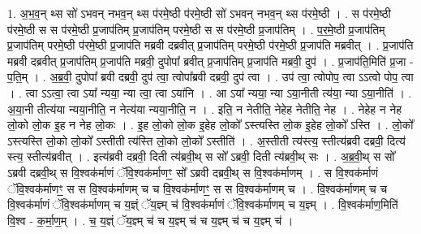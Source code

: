 \documentclass[17pt]{extarticle}
\begin{document}
1. अ॒भ॒व॒न् थ्स सो॑ ऽभवन् नभव॒न् थ्स प॑रमे॒ष्ठी प॑रमे॒ष्ठी सो॑ ऽभवन् नभव॒न् थ्स प॑रमे॒ष्ठी । . स प॑रमे॒ष्ठी प॑रमे॒ष्ठी स स प॑रमे॒ष्ठी प्र॒जाप॑तिम् प्र॒जाप॑तिम् परमे॒ष्ठी स स प॑रमे॒ष्ठी प्र॒जाप॑तिम् । . प॒र॒मे॒ष्ठी प्र॒जाप॑तिम् प्र॒जाप॑तिम् परमे॒ष्ठी प॑रमे॒ष्ठी प्र॒जाप॑ति मब्रवी दब्रवीत् प्र॒जाप॑तिम् परमे॒ष्ठी प॑रमे॒ष्ठी प्र॒जाप॑ति मब्रवीत् । . प्र॒जाप॑ति मब्रवी दब्रवीत् प्र॒जाप॑तिम् प्र॒जाप॑ति मब्रवी॒ दुपोपा᳚ ब्रवीत् प्र॒जाप॑तिम् प्र॒जाप॑ति मब्रवी॒ दुप॑ । . प्र॒जाप॑ति॒मिति॑ प्र॒जा - प॒ति॒म् । . अ॒ब्र॒वी॒ दुपोपा᳚ ब्रवी दब्रवी॒ दुप॑ त्वा॒ त्वोपा᳚ब्रवी दब्रवी॒ दुप॑ त्वा । . उप॑ त्वा॒ त्वोपोप॒ त्वा ऽऽत्वो पोप॒ त्वा । . त्वा ऽऽत्वा॒ त्वा ऽया᳚ न्यया॒ न्या त्वा॒ त्वा ऽया॑नि । . आ ऽया᳚ न्यया॒ न्या ऽया॒नीती त्य॑या॒ न्या ऽया॒नीति॑ । . अ॒या॒नी तीत्य॑या न्यया॒नीति॒ न नेत्य॑या न्यया॒नीति॒ न । . इति॒ न नेतीति॒ नेहेह नेतीति॒ नेह । . नेहेह न नेह लो॒को लो॒क इ॒ह न नेह लो॒कः । . इ॒ह लो॒को लो॒क इ॒हेह लो॒को᳚ ऽस्त्यस्ति लो॒क इ॒हेह लो॒को᳚ ऽस्ति । . लो॒को᳚ ऽस्त्यस्ति लो॒को लो॒को᳚ ऽस्तीती त्य॑स्ति लो॒को लो॒को᳚ ऽस्तीति॑ । . अ॒स्तीती त्य॑स्त्य॒ स्तीत्य॑ब्रवी दब्रवी॒ दित्य॑ स्त्य॒ स्तीत्य॑ब्रवीत् । . इत्य॑ब्रवी दब्रवी॒ दिती त्य॑ब्रवी॒थ् स सो᳚ ऽब्रवी॒ दिती त्य॑ब्रवी॒थ् सः । . अ॒ब्र॒वी॒थ् स सो᳚ ऽब्रवी दब्रवी॒थ् स वि॒श्वक॑र्माणं ॅवि॒श्वक॑र्माणꣳ॒॒ सो᳚ ऽब्रवी दब्रवी॒थ् स वि॒श्वक॑र्माणम् । . स वि॒श्वक॑र्माणं ॅवि॒श्वक॑र्माणꣳ॒॒ स स वि॒श्वक॑र्माणम् च च वि॒श्वक॑र्माणꣳ॒॒ स स वि॒श्वक॑र्माणम् च । . वि॒श्वक॑र्माणम् च च वि॒श्वक॑र्माणं ॅवि॒श्वक॑र्माणम् च य॒ज्ञ्ं ॅय॒ज्ञ्म् च॑ वि॒श्वक॑र्माणं ॅवि॒श्वक॑र्माणम् च य॒ज्ञ्म् । . वि॒श्वक॑र्माण॒मिति॑ वि॒श्व - क॒र्मा॒ण॒म् । . च॒ य॒ज्ञ्ं ॅय॒ज्ञ्म् च॑ च य॒ज्ञ्म् च॑ च य॒ज्ञ्म् च॑ च य॒ज्ञ्म् च॑ । \newline
\end{document}
